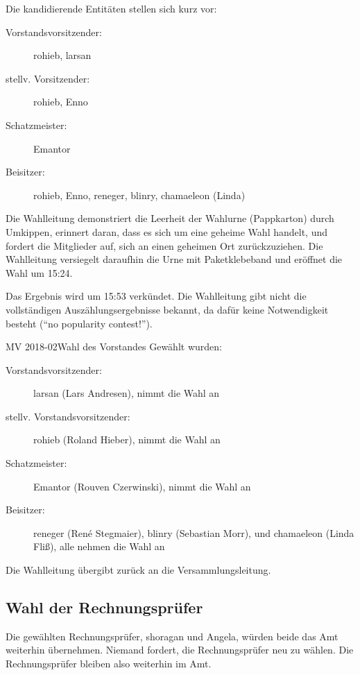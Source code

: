 \documentclass{s0minutes}
\begin{document}
Die kandidierende Entitäten stellen sich kurz vor:
\begin{description}
  \item[Vorstandsvorsitzender:] rohieb, larsan
  \item[stellv. Vorsitzender:] rohieb, Enno
  \item[Schatzmeister:] Emantor
  \item[Beisitzer:] rohieb, Enno, reneger, blinry, chamaeleon (Linda)
\end{description}

Die Wahlleitung demonstriert die Leerheit der Wahlurne (Pappkarton) durch
Umkippen, erinnert daran, dass es sich um eine geheime Wahl handelt, und fordert
die Mitglieder auf, sich an einen geheimen Ort zurückzuziehen. Die Wahlleitung
versiegelt daraufhin die Urne mit Paketklebeband und eröffnet die Wahl um 15:24.


Das Ergebnis wird um 15:53 verkündet. Die Wahlleitung gibt nicht die
vollständigen Auszählungsergebnisse bekannt, da dafür keine Notwendigkeit
besteht ("`no popularity contest!"').

\begin{resolution}{MV 2018-02}{}{Wahl des Vorstandes}{}
Gewählt wurden:

\begin{description}
  \item[Vorstandsvorsitzender:] larsan (Lars Andresen), nimmt die Wahl an
  \item[stellv. Vorstandsvorsitzender:] rohieb (Roland Hieber), nimmt die Wahl
    an
  \item[Schatzmeister:] Emantor (Rouven Czerwinski), nimmt die Wahl an
  \item[Beisitzer:] reneger (René Stegmaier), blinry (Sebastian Morr), und
    chamaeleon (Linda Fliß), alle nehmen die Wahl an
\end{description}
\end{resolution}

Die Wahlleitung übergibt zurück an die Versammlungsleitung.

\vspace{-.3cm}
\subsection{Wahl der Rechnungsprüfer}

Die gewählten Rechnungsprüfer, shoragan und Angela, würden beide das Amt
weiterhin übernehmen. Niemand fordert, die Rechnungsprüfer neu zu wählen.
Die Rechnungsprüfer bleiben also weiterhin im Amt.
\end{document}
